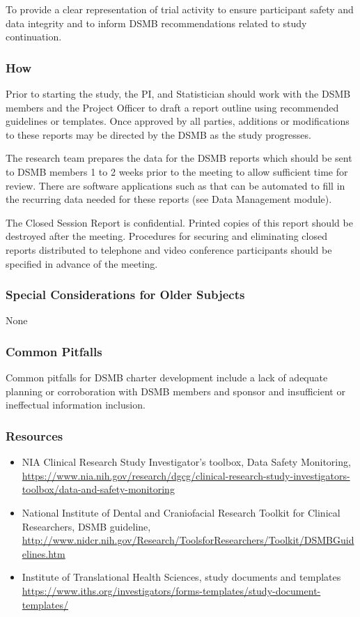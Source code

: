 \documentclass[]{book}
\begin{document}
To provide a clear representation of trial activity to ensure
participant safety and data integrity and to inform DSMB recommendations
related to study continuation.

\subsubsection{How}\label{how-15}

Prior to starting the study, the PI, and Statistician should work with
the DSMB members and the Project Officer to draft a report outline using
recommended guidelines or templates. Once approved by all parties,
additions or modifications to these reports may be directed by the DSMB
as the study progresses.

The research team prepares the data for the DSMB reports which should be
sent to DSMB members 1 to 2 weeks prior to the meeting to allow
sufficient time for review. There are software applications such as that
can be automated to fill in the recurring data needed for these reports
(see Data Management module).

The Closed Session Report is confidential. Printed copies of this report
should be destroyed after the meeting. Procedures for securing and
eliminating closed reports distributed to telephone and video conference
participants should be specified in advance of the meeting.

\subsubsection{Special Considerations for Older
Subjects}\label{special-considerations-for-older-subjects-10}

None

\subsubsection{Common Pitfalls}\label{common-pitfalls-13}

Common pitfalls for DSMB charter development include a lack of adequate
planning or corroboration with DSMB members and sponsor and insufficient
or ineffectual information inclusion.

\subsubsection{Resources}\label{resources-15}

\begin{itemize}
\item
  NIA Clinical Research Study Investigator's toolbox, Data Safety
  Monitoring,
  \url{https://www.nia.nih.gov/research/dgcg/clinical-research-study-investigators-toolbox/data-and-safety-monitoring}
\item
  National Institute of Dental and Craniofacial Research Toolkit for
  Clinical Researchers, DSMB guideline,
  \url{http://www.nidcr.nih.gov/Research/ToolsforResearchers/Toolkit/DSMBGuidelines.htm}
\item
  Institute of Translational Health Sciences, study documents and
  templates
  \url{https://www.iths.org/investigators/forms-templates/study-document-templates/}
\end{itemize}
\end{document}
